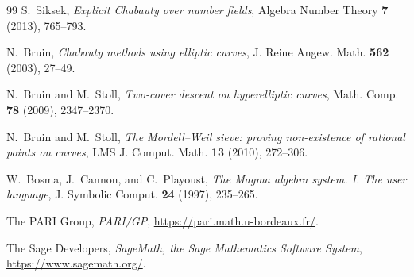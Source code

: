 \documentclass[11pt]{article}
\theoremstyle{definition}
\theoremstyle{remark}
\begin{document}
\begin{thebibliography}{99}
S.~Siksek,
\emph{Explicit Chabauty over number fields},
Algebra Number Theory \textbf{7} (2013), 765--793.

N.~Bruin,
\emph{Chabauty methods using elliptic curves},
J. Reine Angew. Math. \textbf{562} (2003), 27--49.

N.~Bruin and M.~Stoll,
\emph{Two-cover descent on hyperelliptic curves},
Math. Comp. \textbf{78} (2009), 2347--2370.

N.~Bruin and M.~Stoll,
\emph{The Mordell--Weil sieve: proving non-existence of rational points on
curves},
LMS J. Comput. Math. \textbf{13} (2010), 272--306.

W.~Bosma, J.~Cannon, and C.~Playoust,
\emph{The Magma algebra system. I. The user language},
J. Symbolic Comput. \textbf{24} (1997), 235--265.

The PARI Group,
\emph{PARI/GP},
\url{https://pari.math.u-bordeaux.fr/}.

The Sage Developers,
\emph{SageMath, the Sage Mathematics Software System},
\url{https://www.sagemath.org/}.

\end{thebibliography}
\normalsize
\end{document}
